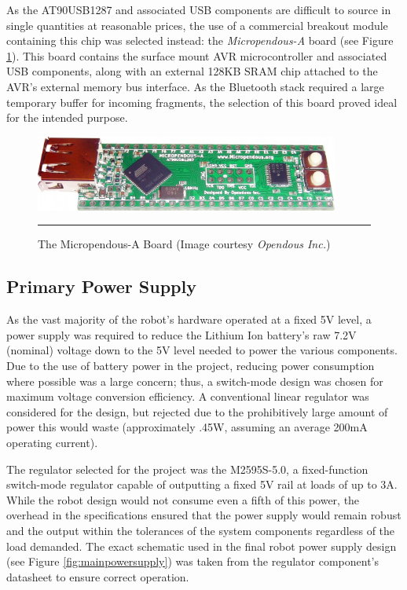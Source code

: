 As the AT90USB1287 and associated USB components are difficult to source in single quantities at reasonable prices, the use of a commercial breakout module containing this chip was selected instead: the \textit{Micropendous-A} board (see Figure \ref{fig:micropendous}). This board contains the surface mount AVR microcontroller and associated USB components, along with an external 128KB SRAM chip attached to the AVR's external memory bus interface. As the Bluetooth stack required a large temporary buffer for incoming fragments, the selection of this board proved ideal for the intended purpose.

\begin{figure}[H]
	\vspace{1em}
	\centering
		\includegraphics[width=100mm]{./Figures/MicropendousA.jpg}
	\rule{35em}{0.5pt}
	\caption[Micropendous-A Board]{The Micropendous-A Board (Image courtesy \textit{Opendous Inc.})}
	\label{fig:micropendous}
\end{figure}

\FloatBarrier
\subsection{Primary Power Supply}

As the vast majority of the robot's hardware operated at a fixed 5V level, a power supply was required to reduce the Lithium Ion battery's raw 7.2V (nominal) voltage down to the 5V level needed to power the various components. Due to the use of battery power in the project, reducing power consumption where possible was a large concern; thus, a switch-mode design was chosen for maximum voltage conversion efficiency. A conventional linear regulator was considered for the design, but rejected due to the prohibitively large amount of power this would waste (approximately .45W, assuming an average 200mA operating current).

The regulator selected for the project was the M2595S-5.0, a fixed-function switch-mode regulator capable of outputting a fixed 5V rail at loads of up to 3A. While the robot design would not consume even a fifth of this power, the overhead in the specifications ensured that the power supply would remain robust and the output within the tolerances of the system components regardless of the load demanded. The exact schematic used in the final robot power supply design (see Figure \ref{fig:mainpowersupply}) was taken from the regulator component's datasheet to ensure correct operation.


